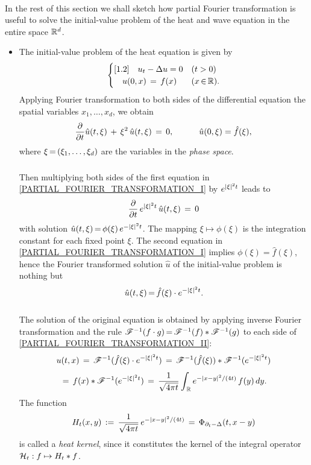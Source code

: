 \documentclass[11pt,twoside]{article}
\begin{document}
\paragraph{} %
In the rest of this section we shall sketch
how {partial Fourier transformation} is useful
to solve the initial-value problem of the heat and wave equation
in the entire space $\Rd$.

\begin{itemize}[leftmargin=4mm]
\item[1.]
The initial-value problem of the heat equation is given by
\[
\begin{cases}[1.2]
\quad u_t - \Delta u = 0   & (t > 0)     \\
\quad u(0,x) \= f(x)       & (x \xeof \R). \\
\end{cases}
\]
Applying Fourier transformation to both sides of the differential equation
{\wrt} the spatial variables $x_1,\ldots,x_d$,
we obtain
\begin{equation}\label{PARTIAL_FOURIER_TRANSFORMATION_I}
\frac{\partial}{\partial t} \hat{u}(t,\xi) \, + \, \xi^2 \, \hat{u}(t,\xi)
\= 0,
\quad \quad \quad
\hat{u}(0,\xi) = \hat{f}(\xi),
\end{equation}
where $\xi \eq (\xi_1,\ldots,\xi_d)$ are the variables
in the \textit{phase space}.

\subparagraph{}
Then multiplying both sides of the first equation
in \eqref{PARTIAL_FOURIER_TRANSFORMATION_I} by $e^{\abs{\xi} ^2 t}$ leads to
\[
\frac{\partial}{\partial t} \, e^{\abs{\xi} ^2 t} \, \hat{u}(t,\xi) \= 0
\]
with solution
$\hat{u}(t,\xi) \eq \phi(\xi) \, e^{- \abs{\xi} ^2 t}$.
The mapping $\xi \mapsto \phi(\xi)$ is
the integration constant for each fixed point $\xi$.
The second equation in \eqref{PARTIAL_FOURIER_TRANSFORMATION_I}
implies $\phi(\xi)=\hat{f}(\xi)$,
hence the Fourier trans\-formed solution $\hat{u}$ 
of the initial-value problem is nothing but
\begin{equation}\label{PARTIAL_FOURIER_TRANSFORMATION_II}
\hat{u}(t,\xi) \eq \hat{f}(\xi) \cdot e^{- \abs{\xi} ^2 t}.
\end{equation}

\subparagraph{}
The solution of the original equation is obtained
by applying inverse Fourier transformation and the rule
$
\FT^{-1}(f \cdot g) \eq \FT^{-1}(f) \ast \FT^{-1}(g)
$
to each side of \eqref{PARTIAL_FOURIER_TRANSFORMATION_II}:
\[
u(t,x) \=
\FT^{-1}(\hat{f}(\xi) \cdot e^{- \abs{\xi} ^2 t}) \=
\FT^{-1}(\hat{f}(\xi)) * \FT^{-1}(e^{- \abs{\xi} ^2 t})
\]
\[
\= f(x) * \FT^{-1}(e^{- \abs{\xi} ^2 t})
\=
\frac{1}{\sqrt{4\pi t}}
\int_{\,\R} e^{-\abs{x-y} ^2/(4t)} \,f(y)\,dy.
\]
The function
\[
H_t(x,y) \, := \,
\frac{1}{\sqrt{4\pi t}} \, e^{- \abs{x-y} ^2/(4t)}
\=
\Phi_{\partial_t - \Delta}(t,x-y)
\]
is called a \textit{heat kernel},
since it constitutes the kernel of the integral operator
$\cal{H}_t:f \mapsto H_t \ast f$.


\end{itemize}
\end{document}

